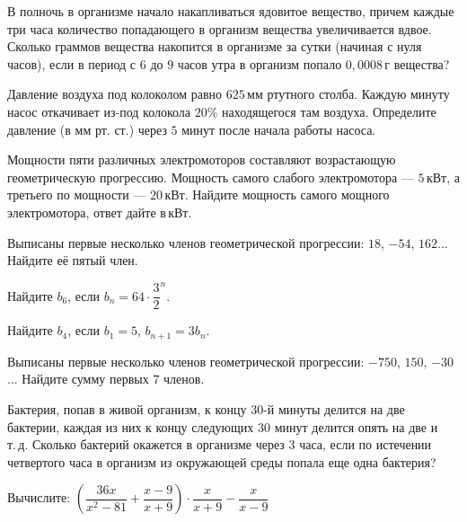 \begin{class}[number=2]
\begin{listofex}
		\item В полночь в организме начало накапливаться ядовитое вещество, причем каждые три часа количество попадающего в организм вещества увеличивается вдвое. Сколько граммов вещества накопится в организме за сутки (начиная с нуля часов), если в период с \( 6 \) до \( 9 \) часов утра в организм попало \( 0,0008 \) г вещества?
		\item Давление воздуха под колоколом равно \( 625 \) мм ртутного столба. Каждую минуту насос откачивает из-под колокола \( 20\% \) находящегося там воздуха. Определите давление (в мм рт. ст.) через \( 5 \) минут после начала работы насоса.
		\item Мощности пяти различных электромоторов составляют возрастающую геометрическую прогрессию. Мощность самого слабого электромотора --- \( 5 \) кВт, а третьего по мощности --- \( 20 \) кВт. Найдите мощность самого мощного электромотора, ответ дайте в кВт.
	\end{listofex}
\end{class}

\begin{homework}[number=1]
	\begin{listofex}
		\item Выписаны первые несколько членов геометрической прогрессии: \( 18 \), \( -54 \), \( 162 \)... Найдите её пятый член.
		\item Найдите \( b_6 \), \quad если \( b_n=64\cdot\dfrac{3}{2}^n \).
		\item Найдите \( b_4 \), \quad если \( b_1=5	\), \( b_{n+1}=3b_n \).
		\item Выписаны первые несколько членов геометрической прогрессии: \( -750 \), \( 150 \), \( -30 \)... Найдите сумму первых \( 7 \) членов.
		\item Бактерия, попав в живой организм, к концу \( 30 \)-й минуты делится на две бактерии, каждая из них к концу следующих \( 30 \) минут делится опять на две и т. д. Сколько бактерий окажется в организме через \( 3 \) часа, если по истечении четвертого часа в организм из окружающей среды попала еще одна бактерия?
		\item Вычислите: \quad \(\left( \dfrac{36x}{x^2-81}+\dfrac{x-9}{x+9} \right)\cdot\dfrac{x}{x+9}-\dfrac{x}{x-9}\)
	\end{listofex}
\end{homework}

